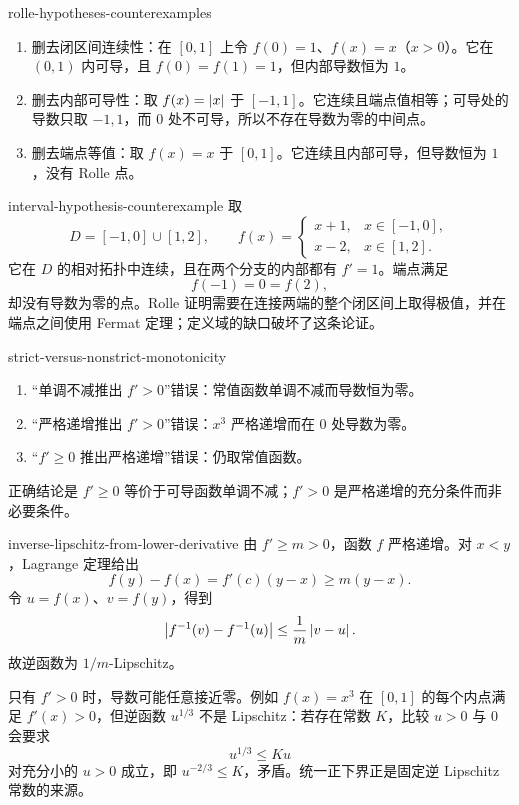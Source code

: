 \begin{solution}{rolle-hypotheses-counterexamples}
\begin{enumerate}
 \item 删去闭区间连续性：在 \([0,1]\) 上令 \(f(0)=1\)、\(f(x)=x\)（\(x>0\)）。它在 \((0,1)\) 内可导，且 \(f(0)=f(1)=1\)，但内部导数恒为 \(1\)。
 \item 删去内部可导性：取 \(f(x)=\left|x\right|\) 于 \([-1,1]\)。它连续且端点值相等；可导处的导数只取 \(-1,1\)，而 \(0\) 处不可导，所以不存在导数为零的中间点。
 \item 删去端点等值：取 \(f(x)=x\) 于 \([0,1]\)。它连续且内部可导，但导数恒为 \(1\)，没有 Rolle 点。
\end{enumerate}
\end{solution}

\begin{solution}{interval-hypothesis-counterexample}
取
\[
 D=[-1,0]\cup[1,2],
\qquad
 f(x)=
 \begin{cases}
 x+1,&x\in[-1,0],\\
 x-2,&x\in[1,2].
 \end{cases}
\]
它在 \(D\) 的相对拓扑中连续，且在两个分支的内部都有 \(f'=1\)。端点满足
\[
 f(-1)=0=f(2),
\]
却没有导数为零的点。Rolle 证明需要在连接两端的整个闭区间上取得极值，并在端点之间使用 Fermat 定理；定义域的缺口破坏了这条论证。
\end{solution}

\begin{solution}{strict-versus-nonstrict-monotonicity}
\begin{enumerate}
 \item “单调不减推出 \(f'>0\)”错误：常值函数单调不减而导数恒为零。
 \item “严格递增推出 \(f'>0\)”错误：\(x^3\) 严格递增而在 \(0\) 处导数为零。
 \item “\(f'\ge0\) 推出严格递增”错误：仍取常值函数。
\end{enumerate}
正确结论是 \(f'\ge0\) 等价于可导函数单调不减；\(f'>0\) 是严格递增的充分条件而非必要条件。
\end{solution}

\begin{solution}{inverse-lipschitz-from-lower-derivative}
由 \(f'\ge m>0\)，函数 \(f\) 严格递增。对 \(x<y\)，Lagrange 定理给出
\[
 f(y)-f(x)=f'(c)(y-x)\ge m(y-x).
\]
令 \(u=f(x)\)、\(v=f(y)\)，得到
\[
 \left|f^{-1}(v)-f^{-1}(u)\right|
 \le\frac1m\left|v-u\right|.
\]
故逆函数为 \(1/m\)-Lipschitz。

只有 \(f'>0\) 时，导数可能任意接近零。例如 \(f(x)=x^3\) 在 \([0,1]\) 的每个内点满足 \(f'(x)>0\)，但逆函数 \(u^{1/3}\) 不是 Lipschitz：若存在常数 \(K\)，比较 \(u>0\) 与 \(0\) 会要求
\[
 u^{1/3}\le Ku
\]
对充分小的 \(u>0\) 成立，即 \(u^{-2/3}\le K\)，矛盾。统一正下界正是固定逆 Lipschitz 常数的来源。
\end{solution}

